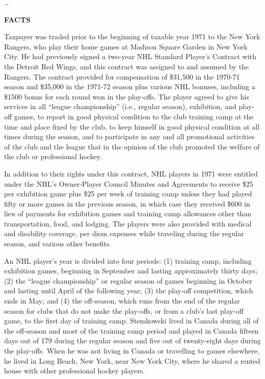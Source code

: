 \begin{select}
\ldots
\begin{center} \textbf{FACTS}
\end{center} 
Taxpayer was traded prior to the beginning of taxable year 1971 to the New York Rangers, who play their home games at Madison Square Garden in New York City. He had previously signed a two-year NHL Standard Player's Contract with the Detroit Red Wings, and this contract was assigned to and assumed by the Rangers. The contract provided for compensation of \$31,500 in the 1970-71 season and \$35,000 in the 1971-72 season plus various NHL bonuses, including a \$1500 bonus for each round won in the play-offs. The player agreed to give his services in all ``league championship'' (i.e., regular season), exhibition, and play-off games, to report in good physical condition to the club training camp at the time and place fixed by the club, to keep himself in good physical condition at all times during the season, and to participate in any and all promotional activities of the club and the league that in the opinion of the club promoted the welfare of the club or professional hockey.

In addition to their rights under this contract, NHL players in 1971 were entitled under the NHL's Owner-Player Council Minutes and Agreements to receive \$25 per exhibition game plus \$25 per week of training camp unless they had played fifty or more games in the previous season, in which case they received \$600 in lieu of payments for exhibition games and training camp allowances other than transportation, food, and lodging. The players were also provided with medical and disability coverage, per diem expenses while traveling during the regular season, and various other benefits.

An NHL player's year is divided into four periods: (1) training camp, including exhibition games, beginning in September and lasting approximately thirty days; (2) the ``league championship'' or regular season of games beginning in October and lasting until April of the following year; (3) the play-off competition, which ends in May; and (4) the off-season, which runs from the end of the regular season for clubs that do not make the play-offs, or from a club's last play-off game, to the first day of training camp. Stemkowski lived in Canada during all of the off-season and most of the training camp period and played in Canada fifteen days out of 179 during the regular season and five out of twenty-eight days during the play-offs. When he was not living in Canada or travelling to games elsewhere, he lived in Long Beach, New York, near New York City, where he shared a rented house with other professional hockey players.


\end{select}
